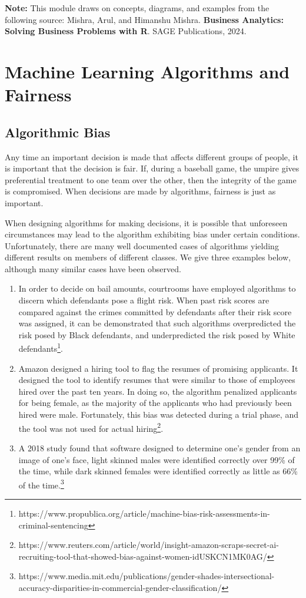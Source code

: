 \begin{boxK}
    \textbf{Note:} This module draws on concepts, diagrams, and examples from the following source:
Mishra, Arul, and Himanshu Mishra. \textbf{Business Analytics: Solving Business Problems with R}. SAGE Publications, 2024.
\end{boxK}

\section{Machine Learning Algorithms and Fairness}


\subsection{Algorithmic Bias}
\par Any time an important decision is made that affects different groups of people, it is important that the decision is fair. If, during a baseball game, the umpire gives preferential treatment to one team over the other, then the integrity of the game is compromised. When decisions are made by algorithms, fairness is just as important. 

\par When designing algorithms for making decisions, it is possible that unforeseen circumstances may lead to the algorithm exhibiting bias under certain conditions. Unfortunately, there are many well documented cases of algorithms yielding different results on members of different classes. We give three examples below, although many similar cases have been observed.
\begin{enumerate}
    \item In order to decide on bail amounts, courtrooms have employed algorithms to discern which defendants pose a flight risk. When past risk scores are compared against the crimes committed by defendants after their risk score was assigned, it can be demonstrated that such algorithms overpredicted the risk posed by Black defendants, and underpredicted the risk posed by White defendants\footnote{https://www.propublica.org/article/machine-bias-risk-assessments-in-criminal-sentencing}.
    \item Amazon designed a hiring tool to flag the resumes of promising applicants. It designed the tool to identify resumes that were similar to those of employees hired over the past ten years. In doing so, the algorithm penalized applicants for being female, as the majority of the applicants who had previously been hired were male. Fortunately, this bias was detected during a trial phase, and the tool was not used for actual hiring\footnote{https://www.reuters.com/article/world/insight-amazon-scraps-secret-ai-recruiting-tool-that-showed-bias-against-women-idUSKCN1MK0AG/}.
    \item A 2018 study found that software designed to determine one’s gender from an image of one’s face, light skinned males were identified correctly over 99\% of the time, while dark skinned females were identified correctly as little as 66\% of the time.\footnote{https://www.media.mit.edu/publications/gender-shades-intersectional-accuracy-disparities-in-commercial-gender-classification/}
\end{enumerate}


